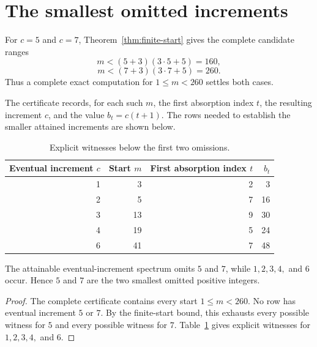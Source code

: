 \section{The smallest omitted increments}

For $c=5$ and $c=7$, Theorem~\ref{thm:finite-start} gives the complete candidate ranges
\[
 m<(5+3)(3\cdot5+5)=160,
\]
\[
 m<(7+3)(3\cdot7+5)=260.
\]
Thus a complete exact computation for $1\le m<260$ settles both cases.

The certificate records, for each such $m$, the first absorption index $t$, the resulting increment $c$, and the value $b_t=c(t+1)$. The rows needed to establish the smaller attained increments are shown below.

\begin{table}[ht]
\centering
\caption{Explicit witnesses below the first two omissions.}
\label{tab:witnesses}
\begin{tabular}{@{}rrrr@{}}
\toprule
Eventual increment $c$ & Start $m$ & First absorption index $t$ & $b_t$ \\
\midrule
1 & 3  & 2 & 3 \\
2 & 5  & 7 & 16 \\
3 & 13 & 9 & 30 \\
4 & 19 & 5 & 24 \\
6 & 41 & 7 & 48 \\
\bottomrule
\end{tabular}
\end{table}

\begin{theorem}
\label{thm:nonsurjective}
The attainable eventual-increment spectrum omits $5$ and $7$, while $1,2,3,4,$ and $6$ occur. Hence $5$ and $7$ are the two smallest omitted positive integers.
\end{theorem}

\begin{proof}
The complete certificate contains every start $1\le m<260$. No row has eventual increment $5$ or $7$. By the finite-start bound, this exhausts every possible witness for $5$ and every possible witness for $7$. Table~\ref{tab:witnesses} gives explicit witnesses for $1,2,3,4,$ and $6$.
\end{proof}

